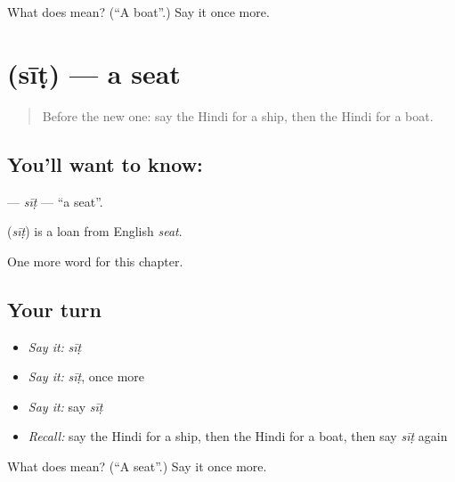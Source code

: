 \begin{tcolorbox}[breakable,colback=teal!4,colframe=teal!35!black,title={Before you move on}]
What does  mean? (\textquotedblleft{}A boat\textquotedblright{}.) Say it once more.
\end{tcolorbox}
\section[\texorpdfstring{\hi{सीट} (sīṭ)}{सीट (sīṭ)}]{ (sīṭ) — a seat}

\label{lesson:HI-C182-sit}



\begin{quote}
Before the new one: say the Hindi for a ship, then the Hindi for a boat.
\end{quote}

\subsection*{You'll want to know: }
\textbf{} — \emph{sīṭ} — \textquotedblleft{}a seat\textquotedblright{}.

\begin{cousinweb}
\textbf{} (\emph{sīṭ}) is a loan from English \emph{seat}.
\end{cousinweb}

\begin{grammarlens}[title={What you've built}]
One more word for this chapter.
\end{grammarlens}

\subsection*{Your turn}
\begin{itemize}
\raggedright
  \item \emph{Say it:} \emph{sīṭ}
  \item \emph{Say it:} \emph{sīṭ}, once more
  \item \emph{Say it:} say \emph{sīṭ}
  \item \emph{Recall:} say the Hindi for a ship, then the Hindi for a boat, then say \emph{sīṭ} again
\end{itemize}

\begin{tcolorbox}[breakable,colback=teal!4,colframe=teal!35!black,title={Before you move on}]
What does  mean? (\textquotedblleft{}A seat\textquotedblright{}.) Say it once more.
\end{tcolorbox}

